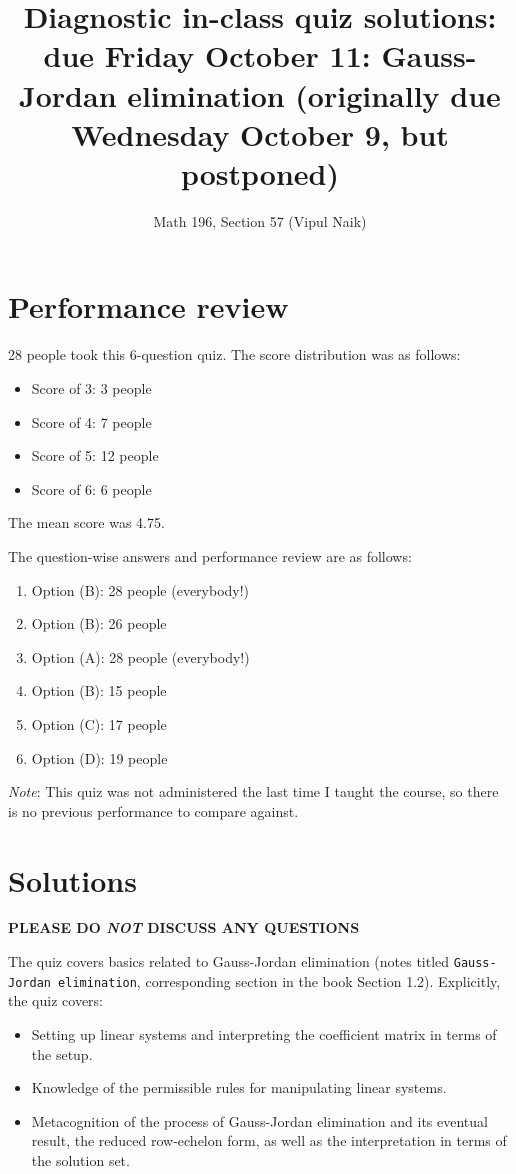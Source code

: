 \documentclass[10pt]{amsart}
\title{Diagnostic in-class quiz solutions: due Friday October 11: Gauss-Jordan elimination (originally due Wednesday October 9, but postponed)}
\author{Math 196, Section 57 (Vipul Naik)}
\begin{document}
\maketitle

\section{Performance review}

28 people took this 6-question quiz. The score distribution was as follows:

\begin{itemize}
\item Score of 3: 3 people
\item Score of 4: 7 people
\item Score of 5: 12 people
\item Score of 6: 6 people
\end{itemize}

The mean score was 4.75.

The question-wise answers and performance review are as follows:

\begin{enumerate}
\item Option (B): 28 people (everybody!)
\item Option (B): 26 people
\item Option (A): 28 people (everybody!)
\item Option (B): 15 people
\item Option (C): 17 people
\item Option (D): 19 people
\end{enumerate}

{\em Note}: This quiz was not administered the last time I taught the
course, so there is no previous performance to compare against.
\section{Solutions}

{\bf PLEASE DO {\em NOT} DISCUSS ANY QUESTIONS}

The quiz covers basics related to Gauss-Jordan elimination (notes
titled {\tt Gauss-Jordan elimination}, corresponding section in the
book Section 1.2). Explicitly, the quiz covers:

\begin{itemize}
\item Setting up linear systems and interpreting the coefficient
  matrix in terms of the setup.
\item Knowledge of the permissible rules for manipulating linear
  systems.
\item Metacognition of the process of Gauss-Jordan elimination and its
  eventual result, the reduced row-echelon form, as well as the
  interpretation in terms of the solution set.
\end{itemize}
\end{document}
